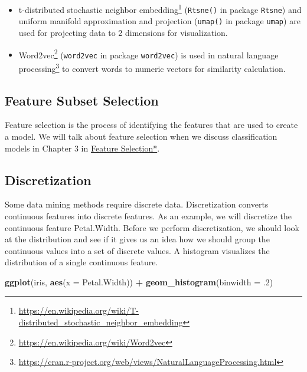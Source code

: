\documentclass[
  notitlepage]{book}
\newenvironment{Shaded}{\begin{snugshade}}{\end{snugshade}}
\newcommand{\DataTypeTok}[1]{\textcolor[rgb]{0.13,0.29,0.53}{#1}}
\newcommand{\FloatTok}[1]{\textcolor[rgb]{0.00,0.00,0.81}{#1}}
\newcommand{\KeywordTok}[1]{\textcolor[rgb]{0.13,0.29,0.53}{\textbf{#1}}}
\newcommand{\NormalTok}[1]{#1}
\newcommand{\OperatorTok}[1]{\textcolor[rgb]{0.81,0.36,0.00}{\textbf{#1}}}
\newcommand{\StringTok}[1]{\textcolor[rgb]{0.31,0.60,0.02}{#1}}
\DeclareRobustCommand{\href}[2]{#2\footnote{\url{#1}}}
\providecommand{\tightlist}{%
  \setlength{\itemsep}{0pt}\setlength{\parskip}{0pt}}
\begin{document}
\begin{itemize}
\tightlist
\item
  \href{https://en.wikipedia.org/wiki/T-distributed_stochastic_neighbor_embedding}{t-distributed stochastic neighbor embedding} (\texttt{Rtsne()} in package \texttt{Rtsne}) and uniform manifold approximation and projection
  (\texttt{umap()} in package \texttt{umap}) are used
  for projecting data to 2 dimensions for visualization.
\item
  \href{https://en.wikipedia.org/wiki/Word2vec}{Word2vec} (\texttt{word2vec} in
  package \texttt{word2vec}) is used in \href{https://cran.r-project.org/web/views/NaturalLanguageProcessing.html}{natural language processing} to convert words to numeric vectors for similarity calculation.
\end{itemize}

\hypertarget{feature-subset-selection}{%
\subsection{Feature Subset Selection}\label{feature-subset-selection}}

Feature selection is the process of identifying the features that are
used to create a model. We will talk about feature selection when we
discuss classification models in Chapter 3 in \protect\hyperlink{feature-selection}{Feature Selection*}.

\hypertarget{discretization}{%
\subsection{Discretization}\label{discretization}}

Some data mining methods require discrete data. Discretization converts
continuous features into discrete features. As an example, we will
discretize the continuous feature Petal.Width. Before we perform
discretization, we should look at the distribution and see if it gives
us an idea how we should group the continuous values into a set of
discrete values. A histogram visualizes the distribution of a single
continuous feature.

\begin{Shaded}
\begin{Highlighting}[]
\KeywordTok{ggplot}\NormalTok{(iris, }\KeywordTok{aes}\NormalTok{(}\DataTypeTok{x =}\NormalTok{ Petal.Width)) }\OperatorTok{+}\StringTok{ }
\StringTok{  }\KeywordTok{geom\_histogram}\NormalTok{(}\DataTypeTok{binwidth =} \FloatTok{.2}\NormalTok{)}
\end{Highlighting}
\end{Shaded}
\end{document}
